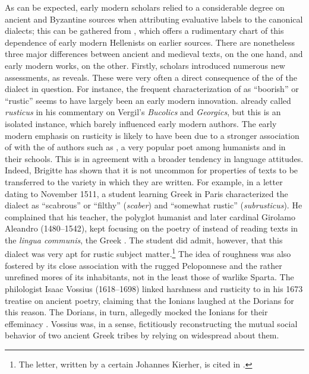 As can be expected, early modern scholars relied to a considerable degree on ancient and Byzantine sources when attributing evaluative labels to the canonical dialects; this can be gathered from , which offers a rudimentary chart of this dependence of early modern Hellenists on earlier sources. There are nonetheless three major differences between ancient and medieval texts, on the one hand, and early modern works, on the other. Firstly, scholars introduced numerous new assessments, as  reveals. These were very often a direct consequence of the  of the dialect in question. For instance, the frequent characterization of  as “boorish” or “rustic” seems to have largely been an early modern innovation.  already called  \textit{rusticus} in his commentary on Vergil’s \textit{Bucolics} and \textit{Georgics}, but this is an isolated instance, which barely influenced early modern authors. The early modern emphasis on  rusticity is likely to have been due to a stronger association of  with the  of authors such as , a very popular poet among humanists and in their schools. This is in agreement with a broader tendency in language attitudes. Indeed, Brigitte \citet{Schlieben-lange1992} has shown that it is not uncommon for properties of texts to be transferred to the variety in which they are written. For example, in a letter dating to November 1511, a  student learning Greek in Paris characterized the  dialect as “scabrous” or “filthy” (\textit{scaber}) and “somewhat rustic” (\textit{subrusticus}). He complained that his teacher, the polyglot humanist and later cardinal Girolamo Aleandro (1480–1542), kept focusing on the  poetry of  instead of reading texts in the \textit{lingua communis}, the Greek . The student did admit, however, that this dialect was very apt for rustic subject matter.\footnote{The letter, written by a certain Johannes Kierher, is cited in \citet[220 n.435; cf. also p. 103]{Botley2010}.} The idea of  roughness was also fostered by its close association with the rugged Peloponnese and the rather unrefined mores of its inhabitants, not in the least those of warlike Sparta. The  philologist Isaac Vossius (1618–1698) linked harshness and rusticity to  in his 1673 treatise on ancient poetry, claiming that the Ionians laughed at the Dorians for this reason. The Dorians, in turn, allegedly mocked the Ionians for their effeminacy \citep[55]{Vossius1673}. Vossius was, in a sense, fictitiously reconstructing the mutual social behavior of two ancient Greek tribes by relying on widespread  about them.


